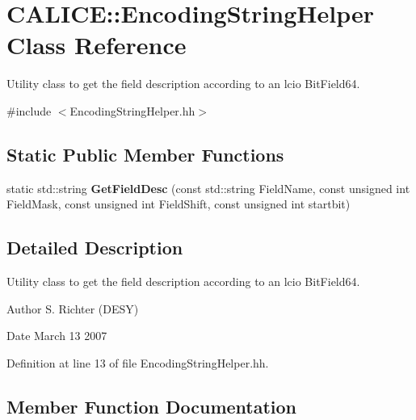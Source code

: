 \section{C\-A\-L\-I\-C\-E\-:\-:Encoding\-String\-Helper Class Reference}
\label{classCALICE_1_1EncodingStringHelper}


Utility class to get the field description according to an lcio Bit\-Field64.  




{\ttfamily \#include $<$Encoding\-String\-Helper.\-hh$>$}

\subsection*{Static Public Member Functions}
\begin{DoxyCompactItemize}
\item 
static std\-::string {\bf Get\-Field\-Desc} (const std\-::string Field\-Name, const unsigned int Field\-Mask, const unsigned int Field\-Shift, const unsigned int startbit)
\end{DoxyCompactItemize}


\subsection{Detailed Description}
Utility class to get the field description according to an lcio Bit\-Field64. 

\begin{DoxyAuthor}{Author}
S. Richter (D\-E\-S\-Y) 
\end{DoxyAuthor}
\begin{DoxyDate}{Date}
March 13 2007 
\end{DoxyDate}


Definition at line 13 of file Encoding\-String\-Helper.\-hh.



\subsection{Member Function Documentation}
